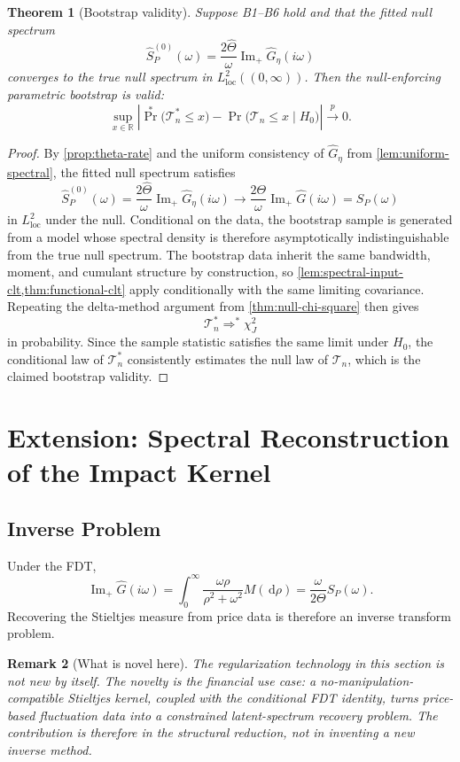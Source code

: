 \documentclass[11pt]{article}
\newtheorem{theorem}{Theorem}[section]
\newtheorem{remark}[theorem]{Remark}
\newcommand{\R}{\mathbb{R}}
\newcommand{\cT}{\mathcal{T}}
\newcommand{\Ghat}{\widehat{G}}
\newcommand{\ImPart}{\operatorname{Im}_{\!+}}
\newcommand{\dd}{\,\mathrm{d}}
\newcommand{\REV}{}
\begin{document}
\begin{theorem}[Bootstrap validity]\label{thm:bootstrap-validity}\REV
Suppose B1--B6 hold and that the fitted null spectrum
\[
  \widehat{S}_P^{(0)}(\omega)=\frac{2\widehat{\Theta}}{\omega}\ImPart \widehat{G}_\eta(i\omega)
\]
converges to the true null spectrum in $L^2_{\mathrm{loc}}((0,\infty))$. Then the null-enforcing parametric bootstrap is valid:
\[
  \sup_{x\in\R}\left|
    \Pr^\ast\!\big(\cT_n^\ast\le x\big)-\Pr\!\big(\cT_n\le x\mid H_0\big)
  \right|
  \xrightarrow{p} 0.
\]
\end{theorem}

\begin{proof}
\REV
By \cref{prop:theta-rate} and the uniform consistency of $\widehat G_\eta$ from \cref{lem:uniform-spectral}, the fitted null spectrum satisfies
\[
  \widehat S_P^{(0)}(\omega)
  =
  \frac{2\widehat\Theta}{\omega}\ImPart \widehat G_\eta(i\omega)
  \to
  \frac{2\Theta}{\omega}\ImPart \Ghat(i\omega)
  =
  S_P(\omega)
\]
in $L^2_{\mathrm{loc}}$ under the null. Conditional on the data, the bootstrap sample is generated from a model whose spectral density is therefore asymptotically indistinguishable from the true null spectrum. The bootstrap data inherit the same bandwidth, moment, and cumulant structure by construction, so \cref{lem:spectral-input-clt,thm:functional-clt} apply conditionally with the same limiting covariance. Repeating the delta-method argument from \cref{thm:null-chi-square} then gives
\[
  \cT_n^\ast\Rightarrow^\ast \chi_J^2
\]
in probability. Since the sample statistic satisfies the same limit under $H_0$, the conditional law of $\cT_n^\ast$ consistently estimates the null law of $\cT_n$, which is the claimed bootstrap validity.
\end{proof}

\section{Extension: Spectral Reconstruction of the Impact Kernel}\label{sec:inverse}

\subsection{Inverse Problem}
Under the FDT,
\[
  \ImPart \Ghat(i\omega)=\int_0^\infty \frac{\omega\rho}{\rho^2+\omega^2}M(\dd\rho)
  =\frac{\omega}{2\Theta}S_P(\omega).
\]
Recovering the Stieltjes measure from price data is therefore an inverse transform problem.

\begin{remark}[What is novel here]
The regularization technology in this section is not new by itself. The novelty is the financial use case: a no-manipulation-compatible Stieltjes kernel, coupled with the conditional FDT identity, turns price-based fluctuation data into a constrained latent-spectrum recovery problem. The contribution is therefore in the structural reduction, not in inventing a new inverse method.
\end{remark}
\end{document}
